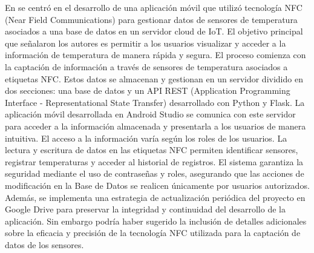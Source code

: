 \bigbreak
En \cite{castillo_herrero_desarrollo_2020} se centró en el desarrollo de una aplicación móvil que utilizó tecnología NFC (Near Field Communications) para gestionar datos de sensores de temperatura asociados a una base de datos en un servidor cloud de IoT. El objetivo principal que señalaron los autores es permitir a los usuarios visualizar y acceder a la información de temperatura de manera rápida y segura. El proceso comienza con la captación de información a través de sensores de temperatura asociados a etiquetas NFC. Estos datos se almacenan y gestionan en un servidor dividido en dos secciones: una base de datos y un API REST (Application Programming Interface - Representational State Transfer) desarrollado con Python y Flask. La aplicación móvil desarrollada en Android Studio se comunica con este servidor para acceder a la información almacenada y presentarla a los usuarios de manera intuitiva. El acceso a la información varía según los roles de los usuarios. La lectura y escritura de datos en las etiquetas NFC permiten identificar sensores, registrar temperaturas y acceder al historial de registros. El sistema garantiza la seguridad mediante el uso de contraseñas y roles, asegurando que las acciones de modificación en la Base de Datos se realicen únicamente por usuarios autorizados. Además, se implementa una estrategia de actualización periódica del proyecto en Google Drive para preservar la integridad y continuidad del desarrollo de la aplicación. Sin embargo podría haber sugerido la inclusión de detalles adicionales sobre la eficacia y precisión de la tecnología NFC utilizada para la captación de datos de los sensores.

